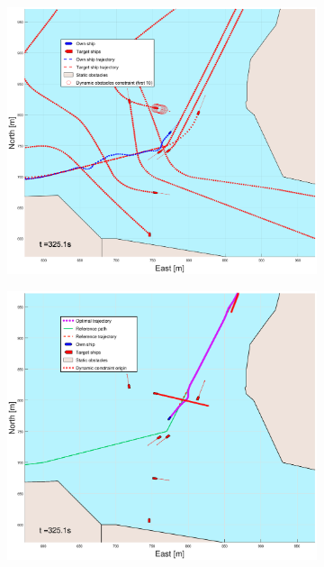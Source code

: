 \begin{figure}[ht]
\begin{subfigure}[b]{0.499\textwidth}
    \end{subfigure}
    \hfill
    \\
    \begin{subfigure}[b]{0.49\textwidth}
        \centering
        \includegraphics[width=\textwidth]{Images/Figures/Trheimfjord/_Simple_1fig1_time=325}
    \end{subfigure}
    \hfill
    \begin{subfigure}[b]{0.499\textwidth}
        \centering
        \includegraphics[width=\textwidth]{Images/Figures/Trheimfjord/_Simple_1fig999_time=325}

\end{subfigure}
\end{figure}
